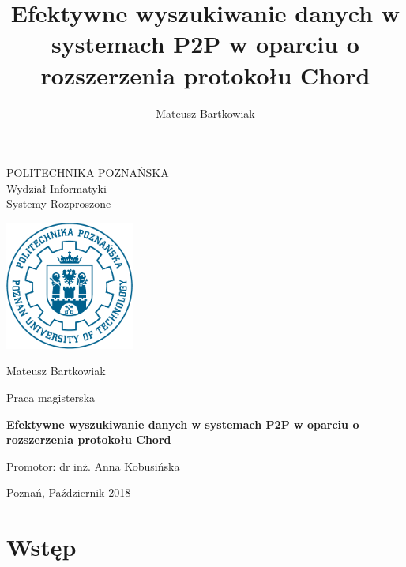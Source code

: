 \documentclass[12pt, twoside, openany]{report}
\author{Mateusz Bartkowiak}
\title{Efektywne wyszukiwanie danych w systemach P2P w oparciu o rozszerzenia protokołu Chord}
\begin{document}
\begin{titlepage}

\noindent


\centering
\Large POLITECHNIKA POZNAŃSKA\\
\Large Wydział Informatyki\\
\large Systemy Rozproszone

\vfill
\includegraphics[width=120pt,height=120pt]{PP}

\vfill
\center
\LARGE
Mateusz Bartkowiak

\center
\Large
Praca magisterska

\vfill
\center
\Huge
\textbf{Efektywne wyszukiwanie danych w systemach P2P w oparciu o rozszerzenia protokołu Chord}


\vfill
\center
\Large
Promotor: dr inż. Anna Kobusińska

\vfill
\center
\large
Poznań, Październik 2018

\end{titlepage}

\tableofcontents



\chapter{Wstęp}
\end{document}
